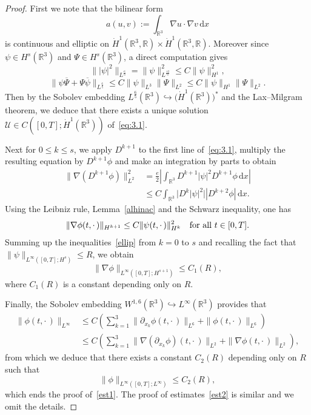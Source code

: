 \documentclass[10pt]{amsart}
\theoremstyle{definition}\newtheorem{defi}[theo]{Definition}\newtheorem{rema}[theo]{Remark}\newtheorem{exam}[theo]{Example}\newtheorem{exem}[theo]{Example}\newtheorem{nota}[theo]{Notation}
\newcommand{\R}{\mathbb{R}}
\newcommand*{\dd}{\mathrm{d}}
\newcommand*{\dx}{\dd x}
\begin{document}
\begin{proof}
First we note that the bilinear form
\[
a(u,v):=\int_{\R^3} \nabla u\cdot \nabla v \,\dx
\]
is continuous and elliptic on $\dot{H}^1(\R^3,\R) \times \dot{H}^1(\R^3,\R)$. Moreover since $\psi \in H^s(\R^3)$ and $\Psi \in H^s(\R^3)$, a direct computation gives
\[
\big\| |\psi|^2 \big\|_{L^{\frac{6}{5}}}
= \| \psi \|_{L^{\frac{12}{5}}}^2 \leq C \| \psi \|_{H^1}^2,
\]
\[
\| \psi \overline{\Psi}+ \Psi \overline{\psi} \|_{L^{\frac{6}{5}}}
\leq C \| \psi \|_{L^3} \| \Psi \|_{L^2} \leq C \| \psi \|_{H^1} \| \Psi \|_{L^2}.
\]
Then by the Sobolev embedding $L^{\frac{6}{5}}(\R^3) \hookrightarrow \big(\dot{H}^1(\R^3)\big)^*$ and the Lax--Milgram theorem, we deduce that there exists a unique solution $\mathcal{U} \in C([0,T];\dot{H}^1(\R^3))$ of~\eqref{eq:3.1}.

Next for $0 \le k \le s$, we apply $D^{k+1}$ to the first line of~\eqref{eq:3.1}, multiply the resulting equation by $D^{k+1} \phi$ and make an integration by parts to obtain
\begin{align*}
\| \nabla (D^{k+1} \phi) \|_{L^2}^2 &= \frac{e}{2} \left | \int_{\R^3} D^{k+1}|\psi |^2 D^{k+1} \phi \,\dx \right | \nonumber \\
& \le C \int_{\R^3} \big| D^{k}|\psi |^2 \big| |D^{k+2} \phi| \,\dx.
\end{align*}
Using the Leibniz rule, Lemma~\ref{alhinac} and the Schwarz inequality, one has
\begin{equation}\label{ellip}
\| \nabla \phi(t,{\cdot\,}) \|_{H^{k+1}}
\le C \| \psi (t,{\cdot\,}) \|_{H^k}^2 \quad
\hbox{for all} \ t \in [0,T].
\end{equation}
Summing up the inequalities~\eqref{ellip} from $k=0$ to $s$ and recalling the fact that $\| \psi \|_{L^\infty([0,T];H^s)}\leq R$, we obtain
\[
\| \nabla\phi \|_{L^\infty([0,T];H^{s+1})}\leq C_1(R),
\]
where $C_1(R)$ is a constant depending only on $R$.

Finally, the Sobolev embedding $W^{1,6}(\R^3) \hookrightarrow L^\infty(\R^3)$ provides that
\begin{align*}
\| \phi(t,{\cdot\,}) \|_{L^\infty} &\leq C \left(\sum_{k=1}^3 \| \partial_{x_k} \phi(t,{\cdot\,}) \|_{L^6} +\| \phi(t,{\cdot\,}) \|_{L^6} \right) \\
&\le C \left(\sum_{k=1}^3 \| \nabla (\partial_{x_k} \phi)(t,{\cdot\,}) \|_{L^2} +\| \nabla \phi(t,{\cdot\,}) \|_{L^2} \right),
\end{align*}
from which we deduce that there exists a constant $C_2(R)$ depending only on $R$ such that
\[
\| \phi \|_{L^\infty([0,T];L^\infty)} \leq C_2(R),
\]
which ends the proof of~\eqref{est1}. The proof of estimates~\eqref{est2} is similar and we omit the details.
\end{proof}
\end{document}
